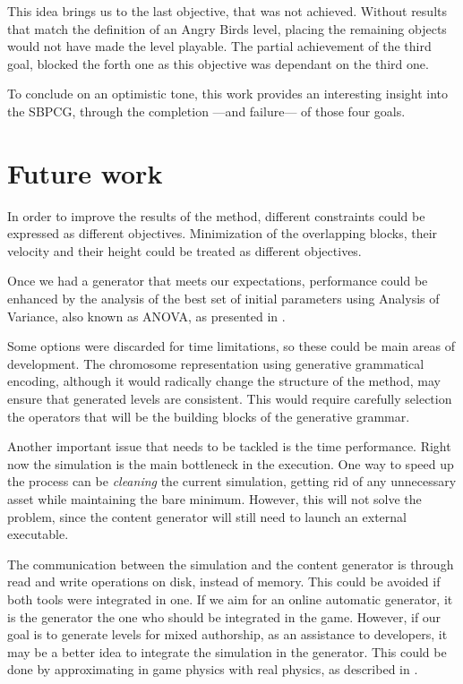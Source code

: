 This idea brings us to the last objective, that was not achieved. Without results that match the definition of an Angry Birds level, placing the remaining objects would not have made the level playable. The partial achievement of the third goal, blocked the forth one as this objective was dependant on the third one. 

To conclude on an optimistic tone, this work provides an interesting insight into the \acf{SBPCG}, through the completion ---and failure--- of those four goals.

\section{Future work}

In order to improve the results of the method, different constraints could be expressed as different objectives. Minimization of the overlapping blocks, their velocity and their height could be treated as different objectives.

Once we had a generator that meets our expectations, performance could be enhanced by the analysis of the best set of initial parameters using Analysis of Variance, also known as ANOVA, as presented in \cite{estevez2017statistical}. 

Some options were discarded for time limitations, so these could be main areas of development. The chromosome representation using generative grammatical encoding\cite{hornby2001advantages}, although it would radically change the structure of the method, may ensure that generated levels are consistent. This would require carefully selection the operators that will be the building blocks of the generative grammar.

Another important issue that needs to be tackled is the time performance. Right now the simulation is the main bottleneck in the execution. One way to speed up the process can be \textit{cleaning} the current simulation, getting rid of any unnecessary asset while maintaining the bare minimum. However, this will not solve the problem, since the content generator will still need to launch an external executable.

The communication between the simulation and the content generator is through read and write operations on disk, instead of memory. This could be avoided if both tools were integrated in one. If we aim for an online automatic generator, it is the generator the one who should be integrated in the game. However, if our goal is to generate levels for mixed authorship, as an assistance to developers, it may be a better idea to integrate the simulation in the generator. This could be done by approximating in game physics with real physics, as described in \cite{blum1970stability}.



